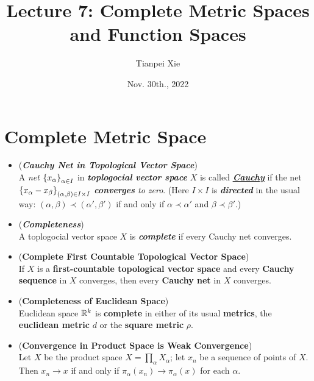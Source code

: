 \documentclass[11pt]{article}
\begin{document}
\title{Lecture 7: Complete Metric Spaces and Function Spaces}
\author{ Tianpei Xie}
\date{ Nov. 30th., 2022 }
\maketitle
\tableofcontents
\newpage
\section{Complete Metric Space}
\begin{itemize}
\item \begin{definition} (\emph{\textbf{Cauchy Net in Topological Vector Space}})\\
A \emph{net}  $\left\{x_\alpha\right\}_{\alpha \in I}$ in \emph{\textbf{toplogocial vector space}} $X$ is called \underline{\emph{\textbf{Cauchy}}} if the net $\left\{x_{\alpha} - x_{\beta}\right\}_{(\alpha, \beta) \in I \times I}$
\emph{\textbf{converges} to zero}. (Here $I \times I$ is \emph{\textbf{directed}} in the usual way: $(\alpha, \beta) \prec (\alpha', \beta')$ if and only if $\alpha \prec \alpha'$ and $\beta \prec \beta'$.) 
\end{definition}

\item \begin{definition} (\emph{\textbf{Completeness}})\\
A toplogocial vector space $X$ is \emph{\textbf{complete}} if every Cauchy net converges.
\end{definition}

\item \begin{proposition} (\textbf{Complete First Countable Topological Vector Space})\\
If $X$ is a \textbf{first-countable topological vector space} and every \textbf{Cauchy sequence} in $X$ converges, then every \textbf{Cauchy net} in $X$ converges.
\end{proposition}

\item \begin{proposition} (\textbf{Completeness of Euclidean Space}) \citep{munkres2000topology} \\
Euclidean space ${\mathbb R}^k$ is \textbf{complete} in either of its usual \textbf{metrics}, the \textbf{euclidean metric} $d$ or the \textbf{square metric} $\rho$.
\end{proposition}

\item \begin{lemma} (\textbf{Convergence in Product Space is Weak Convergence}) \citep{munkres2000topology} \\
Let $X$ be the product space $X = \prod_{\alpha}X_{\alpha}$; let $x_n$ be a sequence of points of $X$. Then $x_n \rightarrow x$ if and only if $\pi_{\alpha}(x_n) \rightarrow  \pi_{\alpha}(x)$ for each $\alpha$.
\end{lemma}


\end{itemize}
\end{document}
